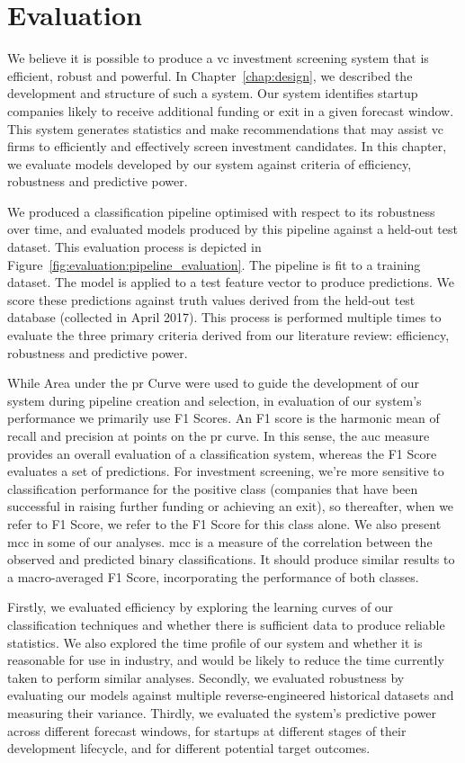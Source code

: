 \documentclass[../thesis/thesis.tex]{subfiles}
\begin{document}
\chapter{Evaluation}
\label{chap:evaluation}

We believe it is possible to produce a \gls{vc} investment screening system that is efficient, robust and powerful. In Chapter~\ref{chap:design}, we described the development and structure of such a system. Our system identifies startup companies likely to receive additional funding or exit in a given forecast window. This system generates statistics and make recommendations that may assist \gls{vc} firms to efficiently and effectively screen investment candidates. In this chapter, we evaluate models developed by our system against criteria of efficiency, robustness and predictive power.

We produced a classification pipeline optimised with respect to its robustness over time, and evaluated models produced by this pipeline against a held-out test dataset. This evaluation process is depicted in Figure~\ref{fig:evaluation:pipeline_evaluation}. The pipeline is fit to a training dataset. The model is applied to a test feature vector to produce predictions. We score these predictions against truth values derived from the held-out test database (collected in April 2017). This process is performed multiple times to evaluate the three primary criteria derived from our literature review: efficiency, robustness and predictive power.

While Area under the \gls{pr} Curve were used to guide the development of our system during pipeline creation and selection, in evaluation of our system's performance we primarily use F1 Scores. An F1 score is the harmonic mean of recall and precision at points on the \gls{pr} curve. In this sense, the \gls{auc} measure provides an overall evaluation of a classification system, whereas the F1 Score evaluates a set of predictions. For investment screening, we're more sensitive to classification performance for the positive class (companies that have been successful in raising further funding or achieving an exit), so thereafter, when we refer to F1 Score, we refer to the F1 Score for this class alone. We also present \gls{mcc} in some of our analyses. \Gls{mcc} is a measure of the correlation between the observed and predicted binary classifications. It should produce similar results to a macro-averaged F1 Score, incorporating the performance of both classes.

Firstly, we evaluated efficiency by exploring the learning curves of our classification techniques and whether there is sufficient data to produce reliable statistics. We also explored the time profile of our system and whether it is reasonable for use in industry, and would be likely to reduce the time currently taken to perform similar analyses. Secondly, we evaluated robustness by evaluating our models against multiple reverse-engineered historical datasets and measuring their variance. Thirdly, we evaluated the system's predictive power across different forecast windows, for startups at different stages of their development lifecycle, and for different potential target outcomes.
\end{document}
